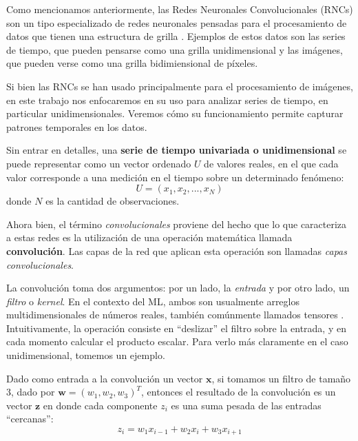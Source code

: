 \documentclass[../../main.tex]{subfiles}
\begin{document}
Como mencionamos anteriormente, las Redes Neuronales Convolucionales (RNCs) son un tipo
especializado de redes neuronales pensadas para el procesamiento de datos que tienen una
estructura de grilla \cite{deep-learning}. Ejemplos de estos datos son las series de
tiempo, que pueden pensarse como una grilla unidimensional y las imágenes, que pueden
verse como una grilla bidimiensional de píxeles.

Si bien las RNCs se han usado principalmente para el procesamiento de imágenes, en este
trabajo nos enfocaremos en su uso para analizar series de tiempo, en particular
unidimensionales. Veremos cómo su funcionamiento permite capturar patrones temporales en
los datos.

Sin entrar en detalles\footnotemark, una \textbf{serie de tiempo univariada o
unidimensional} se puede representar como un vector ordenado \(U\) de valores reales, en
el que cada valor corresponde a una medición en el tiempo sobre un determinado fenómeno:
\[
    U = (x_1, x_2, ..., x_N)
\]
donde \(N\) es la cantidad de observaciones.

Ahora bien, el término \textit{convolucionales} proviene del hecho que lo que caracteriza
a estas redes es la utilización de una operación matemática llamada
\textbf{convolución}\footnotemark \cite{deep-learning}. Las capas de la red que aplican
esta operación son llamadas \textit{capas convolucionales}. 

La convolución toma dos argumentos: por un lado, la \textit{entrada} y por otro lado, un
\textit{filtro} o \textit{kernel}. En el contexto del ML, ambos son usualmente arreglos
multidimensionales de números reales, también comúnmente llamados tensores
\cite{deep-learning}. Intuitivamente, la operación consiste en ``deslizar'' el filtro
sobre la entrada, y en cada momento calcular el producto escalar. Para verlo más
claramente en el caso unidimensional, tomemos un ejemplo.

Dado como entrada a la convolución un vector \(\bm{x}\), si tomamos un filtro de
tamaño 3, dado por \(\bm{w}=(w_1, w_2, w_3)^T\), entonces el resultado de la convolución
es un vector \(\bm{z}\) en donde cada componente \(z_i\) es una suma pesada de las
entradas ``cercanas'':
\[z_i = w_1 x_{i-1} + w_2 x_{i} + w_3 x_{i+1}\]
\end{document}

